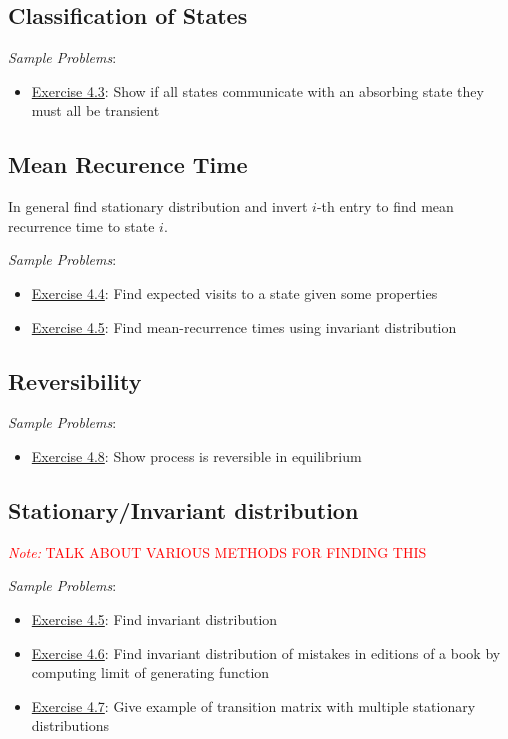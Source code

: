 \documentclass[12pt]{article}
\newcommand{\note}[1]{\textcolor{red}{\textit{Note:} #1}}
\begin{document}
\subsection{Classification of States}


\textit{Sample Problems}: 
\begin{itemize}[nolistsep]
    \item \hyperref[Exercise 4.3]{Exercise 4.3}: Show if all states communicate with an absorbing state they must all be transient
\end{itemize}

\subsection{Mean Recurence Time}
In general find stationary distribution and invert \( i \)-th entry to find mean recurrence time to state \( i \).

\textit{Sample Problems}: 
\begin{itemize}[nolistsep]
    \item \hyperref[Exercise 4.4]{Exercise 4.4}: Find expected visits to a state given some properties
    \item \hyperref[Exercise 4.5]{Exercise 4.5}: Find mean-recurrence times using invariant distribution
\end{itemize}

\subsection{Reversibility}
\textit{Sample Problems}: 
\begin{itemize}[nolistsep]
    \item \hyperref[Exercise 4.8]{Exercise 4.8}: Show process is reversible in equilibrium
\end{itemize}


\subsection{Stationary/Invariant distribution}

\note{TALK ABOUT VARIOUS METHODS FOR FINDING THIS}

\textit{Sample Problems}: 
\begin{itemize}[nolistsep]
    \item \hyperref[Exercise 4.5]{Exercise 4.5}: Find invariant distribution
    \item \hyperref[Exercise 4.6]{Exercise 4.6}: Find invariant distribution of mistakes in editions of a book by computing limit of generating function
    \item \hyperref[Exercise 4.7]{Exercise 4.7}: Give example of transition matrix with multiple stationary distributions
\end{itemize}
\end{document}
